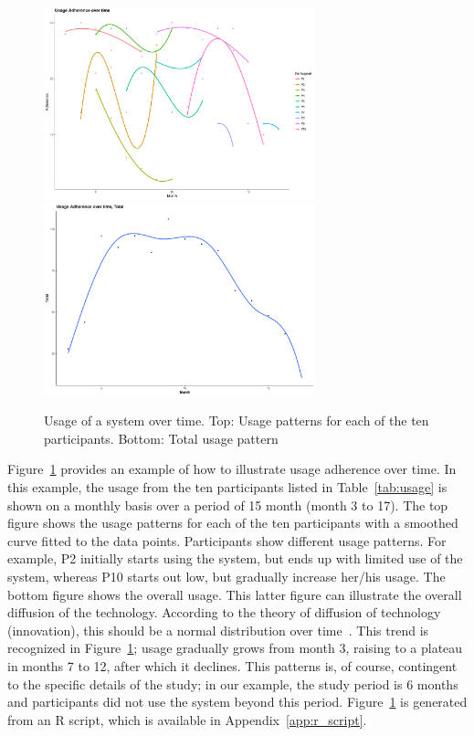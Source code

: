 \begin{figure}[!ht]
    \centering
    \includegraphics[width=0.7\textwidth]{./images/adherence_R_plot.pdf}
    \includegraphics[width=0.7\textwidth]{./images/adherence_total_R_plot.pdf}
    \caption{Usage of a system over time. Top: Usage patterns for each of the ten participants. Bottom: Total usage pattern}
    \label{fig:usage}
\end{figure}


Figure~\ref{fig:usage} provides an example of how to illustrate usage adherence over time. In this example, the usage from the ten participants listed in Table~\ref{tab:usage} is shown on a monthly basis over a period of 15 month (month 3 to 17). 
%
The top figure shows the usage patterns for each of the ten participants with a smoothed curve fitted to the data points. 
Participants show different usage patterns. For example, P2 initially starts using the system, but ends up with limited use of the system, whereas P10 starts out low, but gradually increase her/his usage.
The bottom figure shows the overall usage. This latter figure can illustrate the overall diffusion of the technology. According to the theory of diffusion of technology (innovation), this should be a normal distribution over time~\cite{rogers2003diffusion}. This trend is recognized in Figure~\ref{fig:usage}; usage gradually grows from month 3, raising to a plateau in months 7 to 12, after which it declines. This patterns is, of course, contingent to the specific details of the study; in our example, the study period is 6 months and participants did not use the system beyond this period.
%
Figure~\ref{fig:usage} is generated from an R script, which is available in Appendix~\ref{app:r_script}.


